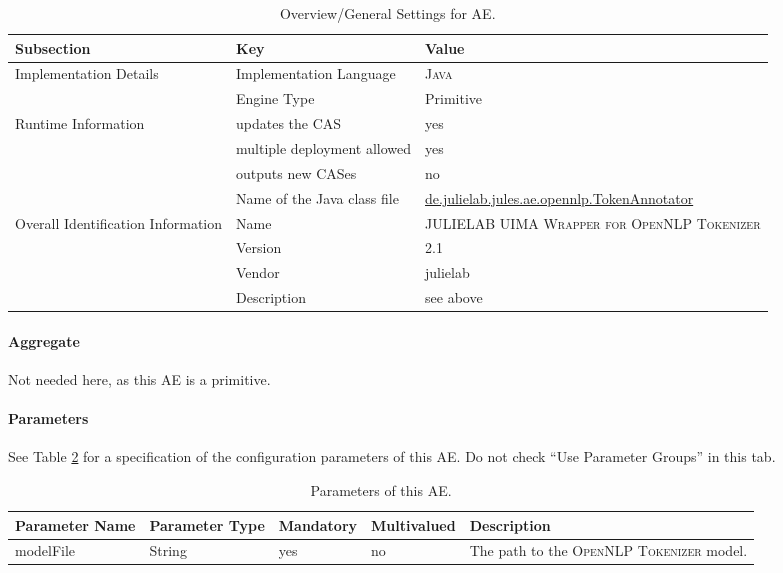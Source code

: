 \documentclass[11pt,a4paper,halfparskip]{scrartcl}
\begin{document}
\begin{table}[h!]
  \centering
  \begin{tabular}{|p{3.5cm}|p{4cm}|p{6cm}|}
    \hline
    Subsection & Key & Value \\
    \hline\hline
    Implementation Details & Implementation Language &  \textsc{Java} \\
    \cline{2-3}
    & Engine Type & Primitive\\
    \hline
    Runtime Information & updates the CAS & yes  \\
    \cline{2-3}
    & multiple deployment allowed & yes \\
    \cline{2-3}
    & outputs new CASes & no \\
    \cline{2-3}
    & Name of the Java class file & \url{de.julielab.jules.ae.opennlp.TokenAnnotator}\\
    \hline
    Overall Identification Information & Name & \textsc{JULIELAB UIMA Wrapper for OpenNLP Tokenizer}
\\
    \cline{2-3}
    & Version & 2.1 \\
    \cline{2-3}
    & Vendor & julielab\\
    \cline{2-3}
    & Description & see above\\
    \hline
  \end{tabular}
  \caption{Overview/General Settings for AE.}
  \label{tab:overview}
\end{table}


\paragraph{Aggregate}
Not needed here, as this AE is a primitive.

\paragraph{Parameters}
\label{sss:parameters}

See Table \ref{tab:parameters} for a specification of the
configuration parameters of this AE. Do not check ``Use Parameter
Groups'' in this tab.

\begin{table}[h!]
  \centering
  \begin{tabular}{|p{4cm}|p{2cm}|p{2cm}|p{2cm}|p{4cm}|}
    \hline 
    Parameter Name & Parameter Type & Mandatory & Multivalued & Description \\
   \hline \hline
      modelFile & String & yes &no & The path to the \textsc{OpenNLP Tokenizer}
model.\\
  \hline
  \end{tabular}
  \caption{Parameters of this AE.}
  \label{tab:parameters}
\end{table}
\end{document}
